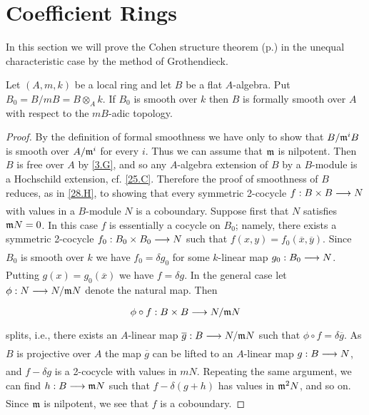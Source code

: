\documentclass[../main]{subfiles}
\begin{document}
\section{Coefficient Rings}\label{sec:37}

In this section we will prove the Cohen structure theorem (p.\pageref{thm:cohen}) in the unequal characteristic case by the method of Grothendieck. 

\begin{theorem}
\label{thm:082}
    Let $(A,m,k)$ be a local ring and let $B$ be a flat $A$-algebra. Put $B_0 = B/mB = B\otimes_A k$. If $B_0$ is smooth over $k$ then $B$ is formally smooth over $A$ with respect to the $mB$-adic topology.
\end{theorem}
\begin{proof}
    By the definition of formal smoothness we have only to show that $B/\mathfrak{m}^i B$ is smooth over $A/\mathfrak{m}^i$ for every $i$. Thus we can assume that $\mathfrak{m}$ is nilpotent. Then $B$ is free over $A$ by \ref{3.G}, and so any $A$-algebra extension of $B$ by a $B$-module is a Hochschild extension, cf. \ref{25.C}. Therefore the proof of smoothness of $B$ reduces, as in \ref{28.H}, to showing that every symmetric 2-cocycle $f:B\times B\varrightarrow{} N$ with values in a $B$-module $N$ is a coboundary. Suppose first that $N$ satisfies $\mathfrak{m}N=0$. In this case $f$ is essentially a cocycle on $B_0$; namely, there exists a symmetric 2-cocycle $f_0:B_0\times B_0\varrightarrow{} N$ such that $f(x,y) = f_0(\overline{x},\overline{y})$. Since $B_0$ is smooth over $k$ we have $f_0 = \delta g_0$ for some $k$-linear map $g_0: B_0\varrightarrow{} N$. Putting $g(x) = g_0(\overline{x})$ we have $f=\delta g$. In the general case let $\phi: N\varrightarrow{} N/\ideal{m}N$ denote the natural map. Then \[\phi\circ f: B\times B \varrightarrow{} N/\ideal{m}N\] splits, i.e., there exists an $A$-linear map $\overline{g}: B\varrightarrow{} N/\ideal{m}N$ such that $\phi\circ f = \delta\overline{g}$. As $B$ is projective over $A$ the map $\overline{g}$ can be lifted to an $A$-linear map $g:B\varrightarrow{} N$, and $f-\delta g$ is a 2-cocycle with values in $mN$. Repeating the same argument, we can find $h:B\varrightarrow{} \ideal{m}N$ such that $f-\delta(g+h)$ has values in $\mathfrak{m}^2 N$, and so on. Since $\mathfrak{m}$ is nilpotent, we see that $f$ is a coboundary.
\end{proof}
\end{document}

